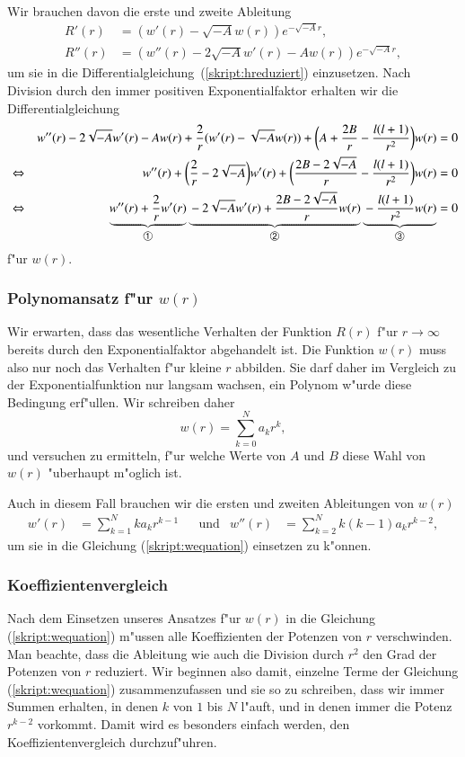 Wir brauchen davon die erste und zweite Ableitung
\begin{align*}
R'(r)&=(w'(r)-\sqrt{-A}w(r))e^{-\sqrt{-A}r},
\\
R''(r)&=(w''(r)-2\sqrt{-A}w'(r)-Aw(r))e^{-\sqrt{-A}r},
\end{align*}
um sie in die Differentialgleichung~(\ref{skript:hreduziert}) einzusetzen.
Nach Division durch den immer positiven Exponentialfaktor
erhalten wir die Differentialgleichung
\begin{align}
&&
w''(r)-2\sqrt{-A}w'(r)-Aw(r)
+\frac2{r}(w'(r)-\sqrt{-A}w(r))
+\biggl(A+\frac{2B}r-\frac{l(l+1)}{r^2}\biggr)w(r)&=0
\notag
\\
&\Leftrightarrow&
w''(r)+\biggl(\frac{2}{r}-2\sqrt{-A}\biggr)w'(r)
+\biggl(\frac{2B-2\sqrt{-A}}{r}-\frac{l(l+1)}{r^2}\biggr)w(r)&=0
\notag
\\
&\Leftrightarrow&
\underbrace{
w''(r)+\frac{2}{r}w'(r)
}_{\text{\normalsize\ding{192}}}
\underbrace{\mathstrut-2\sqrt{-A}w'(r)
+\frac{2B-2\sqrt{-A}}{r} w(r)
}_{\text{\normalsize\ding{193}}}
\underbrace{\mathstrut-\frac{l(l+1)}{r^2}w(r)}_{\text{\normalsize\ding{194}}}&=0
\label{skript:wequation}
\end{align}
f"ur $w(r)$.

\subsubsection{Polynomansatz f"ur $w(r)$}
Wir erwarten, dass das wesentliche Verhalten der Funktion $R(r)$ 
f"ur $r\to\infty$ bereits durch den Exponentialfaktor abgehandelt ist.
Die Funktion $w(r)$ muss also nur noch das Verhalten f"ur kleine $r$
abbilden.
Sie darf daher im Vergleich zu der Exponentialfunktion nur langsam wachsen,
ein Polynom w"urde diese Bedingung erf"ullen.
Wir schreiben daher
\[
w(r)=\sum_{k=0}^N a_kr^k,
\]
und versuchen zu ermitteln, f"ur welche Werte von $A$ und $B$ diese
Wahl von $w(r)$ "uberhaupt m"oglich ist.

Auch in diesem Fall brauchen wir die ersten und zweiten Ableitungen von
$w(r)$
\begin{align*}
w'(r)&=\sum_{k=1}^Nka_kr^{k-1}
&&\text{und}
&
w''(r)&=\sum_{k=2}^Nk(k-1)a_kr^{k-2},
\end{align*}
um sie in die Gleichung (\ref{skript:wequation}) einsetzen zu k"onnen.

\subsubsection{Koeffizientenvergleich}
Nach dem Einsetzen unseres Ansatzes f"ur $w(r)$ in die Gleichung
(\ref{skript:wequation})
m"ussen alle Koeffizienten der Potenzen von $r$ verschwinden.
Man beachte, dass die Ableitung wie auch die Division durch $r^2$ den
Grad der Potenzen von $r$ reduziert.
Wir beginnen also damit, einzelne Terme der Gleichung
(\ref{skript:wequation}) zusammenzufassen und sie so zu schreiben,
dass wir immer Summen erhalten, in denen $k$ von $1$ bis $N$ l"auft, 
und in denen immer die Potenz $r^{k-2}$ vorkommt.
Damit wird es besonders einfach werden, den Koeffizientenvergleich
durchzuf"uhren.

